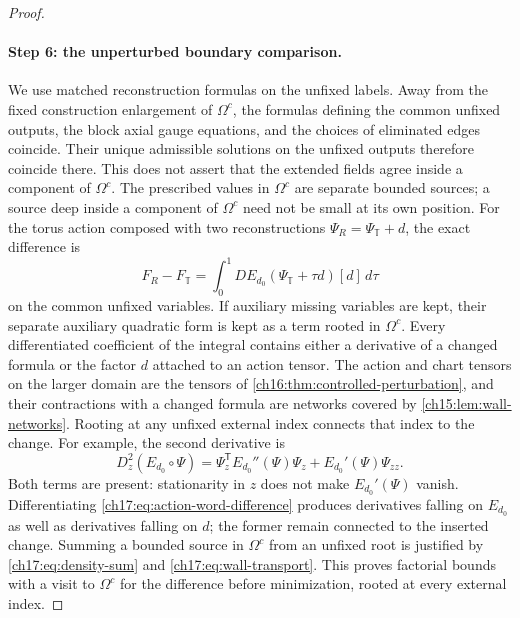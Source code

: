 \begin{proof}
\paragraph{Step 6: the unperturbed boundary comparison.}
We use matched reconstruction formulas on the unfixed labels. Away from the fixed construction enlargement of $\Omega^c$, the formulas defining the common unfixed outputs, the block axial gauge equations, and the choices of eliminated edges coincide. Their unique admissible solutions on the unfixed outputs therefore coincide there. This does not assert that the extended fields agree inside a component of $\Omega^c$. The prescribed values in $\Omega^c$ are separate bounded sources; a source deep inside a component of $\Omega^c$ need not be small at its own position. For the torus action composed with two reconstructions $\Psi_R=\Psi_{\mathbb T}+d$, the exact difference is
\begin{equation}\label{ch17:eq:action-word-difference}
 F_R-F_{\mathbb T}=\int_0^1DE_{d_0}(\Psi_{\mathbb T}+\tau d)[d]\,d\tau
\end{equation}
on the common unfixed variables. If auxiliary missing variables are kept, their separate auxiliary quadratic form is kept as a term rooted in $\Omega^c$. Every differentiated coefficient of the integral contains either a derivative of a changed formula or the factor $d$ attached to an action tensor. The action and chart tensors on the larger domain are the tensors of \cref{ch16:thm:controlled-perturbation}, and their contractions with a changed formula are networks covered by \cref{ch15:lem:wall-networks}. Rooting at any unfixed external index connects that index to the change. For example, the second derivative is
\[
 D_z^2(E_{d_0}\circ\Psi)=\Psi_z^{\mathsf T}E_{d_0}''(\Psi)\Psi_z+E_{d_0}'(\Psi)\Psi_{zz}.
\]
Both terms are present: stationarity in $z$ does not make $E_{d_0}'(\Psi)$ vanish. Differentiating \eqref{ch17:eq:action-word-difference} produces derivatives falling on $E_{d_0}$ as well as derivatives falling on $d$; the former remain connected to the inserted change. Summing a bounded source in $\Omega^c$ from an unfixed root is justified by \eqref{ch17:eq:density-sum} and \eqref{ch17:eq:wall-transport}. This proves factorial bounds with a visit to $\Omega^c$ for the difference before minimization, rooted at every external index.


\end{proof}
